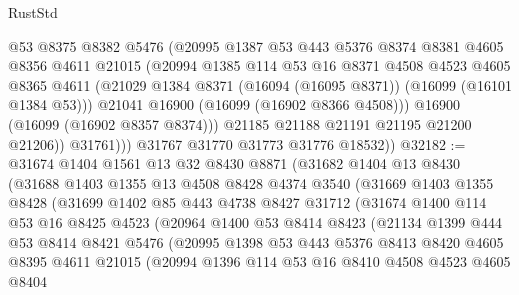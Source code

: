 \begin{lexlean}{RustStd}
\begin{coremodule}
                  @53
                  @8375
                  @8382
                  @5476
                  (@20995
                    @1387
                    @53
                    @443
                    @5376
                    @8374
                    @8381
                    @4605
                    @8356
                    @4611
                    @21015
                    (@20994
                      @1385
                      @114
                      @53
                      @16
                      @8371
                      @4508
                      @4523
                      @4605
                      @8365
                      @4611
                      (@21029 @1384 @8371 (@16094 (@16095 @8371)) (@16099 (@16101 @1384 @53)))
                      @21041
                      @16900
                      (@16099 (@16902 @8366 @4508)))
                    @16900
                    (@16099 (@16902 @8357 @8374)))
                  @21185
                  @21188
                  @21191
                  @21195
                  @21200
                  @21206))
              @31761)))
        @31767
        @31770
        @31773
        @31776
        @18532))
@32182 := @31674
    @1404
    @1561
    @13
    @32
    @8430
    @8871
    (@31682
      @1404
      @13
      @8430
      (@31688
        @1403
        @1355
        @13
        @4508
        @8428
        @4374
        @3540
        (@31669
          @1403
          @1355
          @8428
          (@31699
            @1402
            @85
            @443
            @4738
            @8427
            @31712
            (@31674
              @1400
              @114
              @53
              @16
              @8425
              @4523
              (@20964
                @1400
                @53
                @8414
                @8423
                (@21134
                  @1399
                  @444
                  @53
                  @8414
                  @8421
                  @5476
                  (@20995
                    @1398
                    @53
                    @443
                    @5376
                    @8413
                    @8420
                    @4605
                    @8395
                    @4611
                    @21015
                    (@20994
                      @1396
                      @114
                      @53
                      @16
                      @8410
                      @4508
                      @4523
                      @4605
                      @8404

\end{coremodule}
\end{lexlean}

